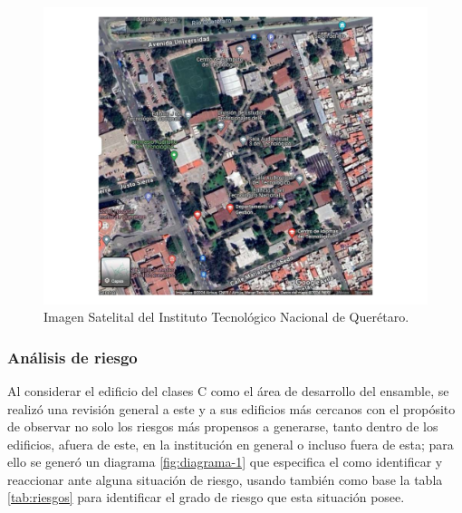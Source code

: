     \begin{figure}[H]
    \centering
    \includegraphics[scale=0.32]{19/Img/mapaITQ-2.pdf}
    \caption{Imagen Satelital del Instituto Tecnológico Nacional de Querétaro.}
    \label{fig:mapaITQ-2}
\end{figure}

 \subsubsection{Análisis de riesgo}

 Al considerar el edificio del clases C como el área de desarrollo del ensamble, se realizó una revisión general a este y a sus edificios más cercanos con el propósito de observar no solo los riesgos más propensos a generarse, tanto dentro de los edificios, afuera de este, en la institución en general o incluso fuera de esta; para ello se generó un diagrama \ref{fig:diagrama-1} que especifica el como identificar y reaccionar ante alguna situación de riesgo, usando también como base la tabla \ref{tab:riesgos} para identificar el grado de riesgo que esta situación posee.

